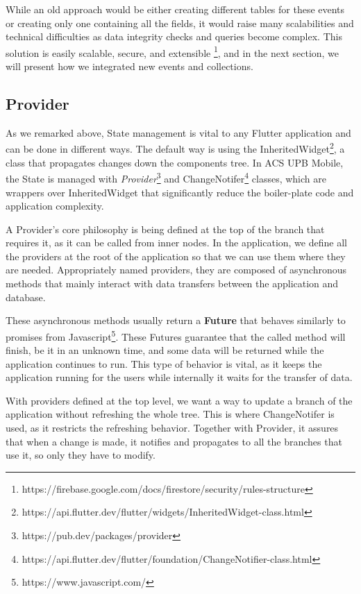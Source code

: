 While an old approach would be either creating different tables for these events or creating only one containing all the fields, it would raise many scalabilities and technical difficulties as data integrity checks and queries become complex. 
This solution is easily scalable, secure, and extensible \footnote{https://firebase.google.com/docs/firestore/security/rules-structure}, and in the next section, we will present how we integrated new events and collections.

    \subsection{Provider} \label{4:app:provider}
    As we remarked above, State management is vital to any Flutter application and can be done in different ways. The default way is using the InheritedWidget\footnote{https://api.flutter.dev/flutter/widgets/InheritedWidget-class.html}, a class that propagates changes down the components tree.
In ACS UPB Mobile, the State is managed with \textit{Provider}\footnote{https://pub.dev/packages/provider} and ChangeNotifer\footnote{https://api.flutter.dev/flutter/foundation/ChangeNotifier-class.html} classes, which are wrappers over InheritedWidget that significantly reduce the boiler-plate code and application complexity. 

A Provider’s core philosophy is being defined at the top of the branch that requires it, as it can be called from inner nodes. In the application, we define all the providers at the root of the application so that we can use them where they are needed. Appropriately named providers, they are composed of asynchronous methods that mainly interact with data transfers between the application and database. 

These asynchronous methods usually return a \textbf{Future} that behaves similarly to promises from Javascript\footnote{https://www.javascript.com/}. These Futures guarantee that the called method will finish, be it in an unknown time, and some data will be returned while the application continues to run. This type of behavior is vital, as it keeps the application running for the users while internally it waits for the transfer of data.

With providers defined at the top level, we want a way to update a branch of the application without refreshing the whole tree. This is where ChangeNotifer is used, as it restricts the refreshing behavior. Together with Provider, it assures that when a change is made, it notifies and propagates to all the branches that use it, so only they have to modify. 

